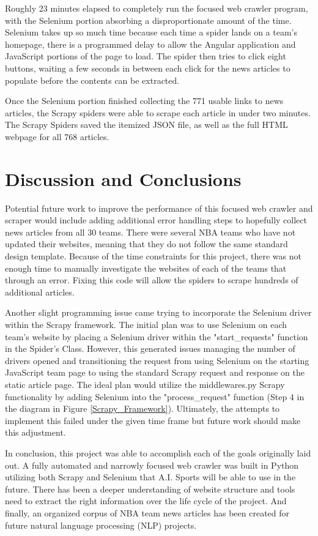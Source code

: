 \documentclass[5p,authoryear]{elsarticle}
\begin{document}
Roughly 23 minutes elapsed to completely run the focused web crawler program, with the Selenium portion absorbing a disproportionate amount of the time. Selenium takes up so much time because each time a spider lands on a team's homepage, there is a programmed delay to allow the Angular application and JavaScript portions of the page to load. The spider then tries to click eight buttons, waiting a few seconds in between each click for the news articles to populate before the contents can be extracted. 

Once the Selenium portion finished collecting the 771 usable links to news articles, the Scrapy spiders were able to scrape each article in under two minutes. The Scrapy Spiders saved the itemized JSON file, as well as the full HTML webpage for all 768 articles.


\section{Discussion and Conclusions}

Potential future work to improve the performance of this focused web crawler and scraper would include adding additional error handling steps to hopefully collect news articles from all 30 teams. There were several NBA teams who have not updated their websites, meaning that they do not follow the same standard design template. Because of the time constraints for this project, there was not enough time to manually investigate the websites of each of the teams that through an error. Fixing this code will allow the spiders to scrape hundreds of additional articles.

Another slight programming issue came trying to incorporate the Selenium driver within the Scrapy framework. The initial plan was to use Selenium on each team's website by placing a Selenium driver within the "start\_requests" function in the Spider's Class. However, this generated issues managing the number of drivers opened and transitioning the request from using Selenium on the starting JavaScript team page to using the standard Scrapy request and response on the static article page. The ideal plan would utilize the middlewares.py Scrapy functionality by adding Selenium into the "process\_request" function (Step 4 in the diagram in Figure \ref{Scrapy_Framework}). Ultimately, the attempts to implement this failed under the given time frame but future work should make this adjustment. 

In conclusion, this project was able to accomplish each of the goals originally laid out. A fully automated and narrowly focused web crawler was built in Python utilizing both Scrapy and Selenium that A.I. Sports will be able to use in the future. There has been a deeper understanding of website structure and tools need to extract the right information over the life cycle of the project. And finally, an organized corpus of NBA team news articles has been created for future natural language processing (NLP) projects.


\clearpage




\end{document}
